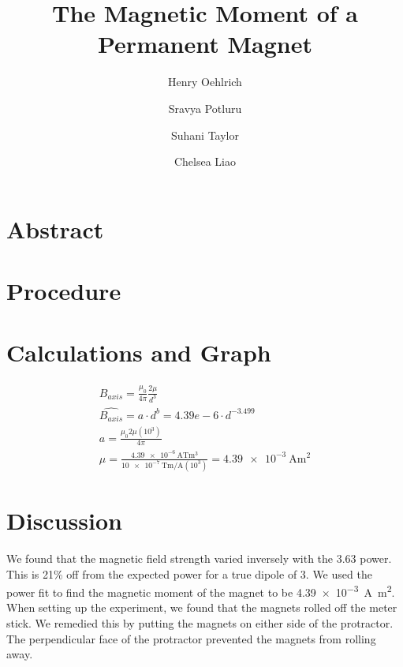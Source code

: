 \documentclass{article}
\title{The Magnetic Moment of a Permanent Magnet}
\author{Henry Oehlrich\and Sravya Potluru\and Suhani Taylor\and Chelsea Liao}
\begin{document}
\maketitle

\section{Abstract}

\section{Procedure}

\begin{itemize}
\end{itemize}

\section{Calculations and Graph}

\setlength{\jot}{15pt}
\begin{gather}
    B_{axis} = \frac{\mu_0}{4\pi} \frac{2\mu}{d^3} \\
    \hat{B_{axis}} = a \cdot d^{b} = 4.39e-6 \cdot d^{-3.499} \\
    a = \frac{\mu_0 2 \mu (10^3)}{4\pi} \\
    \mu =
    \frac{\SI{4.39e-6}{\ampere\tesla\meter\cubed}}{\SI{10e-7}{\tesla\meter\per\ampere}(10^3)} = \SI{4.39e-3}{\ampere\meter\squared}
\end{gather}

\begin{center}
\end{center}

\section{Discussion}

We found that the magnetic field strength varied inversely with the 3.63 power.
This is 21\% off from the expected power for a true dipole of 3. We used the
power fit to find the magnetic moment of the magnet to be
\SI{4.39e-3}{\ampere\meter\squared}. When setting up the experiment, we found
that the magnets rolled off the meter stick. We remedied this by putting the
magnets on either side of the protractor. The perpendicular face of the
protractor prevented the magnets from rolling away.
\end{document}
